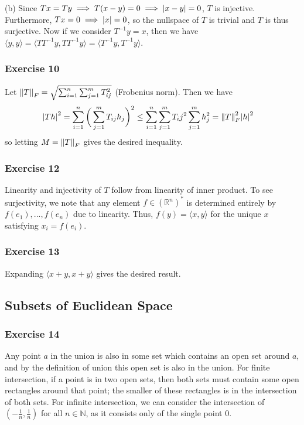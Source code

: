 (b) Since $Tx = Ty \implies T(x - y) = 0 \implies \abs{x - y} = 0$, $T$ is injective. Furthermore,  
$Tx = 0 \implies \abs{x} = 0$, so the nullspace of $T$ is trivial and $T$ is thus surjective. Now if we
consider $T^{-1} y = x$, then we have $\langle y, y \rangle = \langle TT^{-1} y, TT^{-1} y \rangle = \langle T^{-1} y, T^{-1} y \rangle$.

\subsubsection{Exercise 10}
Let $\norm{T}_F = \sqrt{\sum_{i = 1}^n \sum_{j = 1}^m T_{ij}^2}$ (Frobenius norm). Then we have
\begin{align*}
        \abs{T h}^2 = \sum_{i = 1}^n \bigg(\sum_{j = 1}^m T_{ij} h_j\bigg)^2 &\leq \sum_{i = 1}^n \sum_{j = 1}^m T_ij^2 \sum_{j = 1}^m h_j^2 = \norm{T}_F^2 \abs{h}^2
\end{align*}
so letting $M = \norm{T}_F$ gives the desired inequality.

\subsubsection{Exercise 12}
Linearity and injectivity of $T$ follow from linearity of inner product. To see surjectivity, we note that 
any element $f \in (\mathbb{R}^n)^*$ is determined entirely by $f(e_1), ..., f(e_n)$ due to linearity. Thus,
$f(y) = \langle x, y \rangle$ for the unique $x$ satisfying $x_i = f(e_i)$.

\subsubsection{Exercise 13}
Expanding $\langle x + y, x + y \rangle$ gives the desired result.

\subsection{Subsets of Euclidean Space}

\subsubsection{Exercise 14}
Any point $a$ in the union is also in some set which contains an open set around $a$, and by the definition of
union this open set is also in the union. For finite intersection, if a point is in two open sets, then both
sets must contain some open rectangles around that point; the smaller of these rectangles is in the 
intersection of both sets. For infinite intersection, we can consider the intersection of 
$(-\frac{1}{n}, \frac{1}{n})$ for all $n \in \mathbb{N}$, as it consists only of the single point 0.

